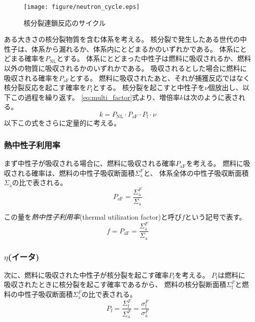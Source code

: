 \begin{figure}[htbp]
  \centering
  \texttt{[image: figure/neutron\_cycle.eps]}
  \caption{核分裂連鎖反応のサイクル}
  \label{fig:neutron_cycle}
\end{figure}

ある大きさの核分裂物質を含む体系を考える。
核分裂で発生したある世代の中性子は、体系から漏れるか、体系内にとどまるかのいずれかである。
体系にとどまる確率を$P_\text{NL}$とする。
体系にとどまった中性子は燃料に吸収されるか、燃料以外の物質に吸収されるかのいずれかである。
吸収されるとした場合に燃料に吸収される確率を$P_\text{aF}$とする。
燃料に吸収されたあと、それが捕獲反応ではなく核分裂反応を起こす確率を$P_\text{f}$とする。
核分裂を起こすと中性子を$\nu$個放出し、以下この過程を繰り返す。
\ref{eq:multi_factor}式より、増倍率$k$は次のように表される。
\begin{equation}
  k = P_\text{NL} \cdot P_\text{aF} \cdot P_\text{f} \cdot \nu
\end{equation}
以下この式をさらに定量的に考える。

\subsubsection{熱中性子利用率}
まず中性子が吸収される場合に、燃料に吸収される確率$P_\text{aF}$を考える。
燃料に吸収される確率は、燃料の中性子吸収断面積$\Sigma_\text{a}^{F}$と、
体系全体の中性子吸収断面積$\Sigma_\text{a}$の比で表される。
\begin{equation}
  P_\text{aF} = \frac{\Sigma_\text{a}^{F}}{\Sigma_\text{a}}
\end{equation}

この量を\emph{熱中性子利用率}(thermal utilization factor)と呼び$f$という記号で表す。
\begin{equation}
  f = P_\text{aF} = \frac{\Sigma_\text{a}^{F}}{\Sigma_\text{a}}
\end{equation}

\subsubsection{$\eta$(イータ)}
次に、燃料に吸収された中性子が核分裂を起こす確率$P_\text{f}$を考える。
$P_\text{f}$は燃料に吸収されたときに核分裂を起こす確率であるから、
燃料の核分裂断面積$\Sigma_\text{f}^{F}$と燃料の中性子吸収断面積$\Sigma_\text{a}^{F}$の比で表される。
\begin{equation}
  P_\text{f} = \frac{\Sigma_\text{f}^{F}}{\Sigma_\text{a}^{F}}= \frac{\sigma_\text{f}^{F}}{\sigma_\text{a}^{F}}
\end{equation}

